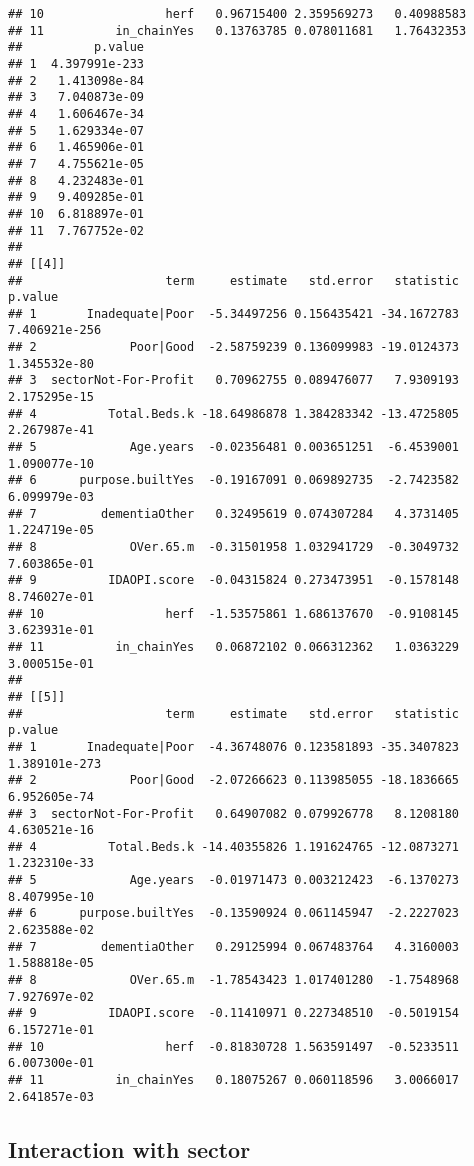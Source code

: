 \documentclass[]{article}
\begin{document}
\begin{verbatim}
## 10                 herf   0.96715400 2.359569273   0.40988583
## 11          in_chainYes   0.13763785 0.078011681   1.76432353
##          p.value
## 1  4.397991e-233
## 2   1.413098e-84
## 3   7.040873e-09
## 4   1.606467e-34
## 5   1.629334e-07
## 6   1.465906e-01
## 7   4.755621e-05
## 8   4.232483e-01
## 9   9.409285e-01
## 10  6.818897e-01
## 11  7.767752e-02
## 
## [[4]]
##                    term     estimate   std.error   statistic       p.value
## 1       Inadequate|Poor  -5.34497256 0.156435421 -34.1672783 7.406921e-256
## 2             Poor|Good  -2.58759239 0.136099983 -19.0124373  1.345532e-80
## 3  sectorNot-For-Profit   0.70962755 0.089476077   7.9309193  2.175295e-15
## 4          Total.Beds.k -18.64986878 1.384283342 -13.4725805  2.267987e-41
## 5             Age.years  -0.02356481 0.003651251  -6.4539001  1.090077e-10
## 6      purpose.builtYes  -0.19167091 0.069892735  -2.7423582  6.099979e-03
## 7         dementiaOther   0.32495619 0.074307284   4.3731405  1.224719e-05
## 8             OVer.65.m  -0.31501958 1.032941729  -0.3049732  7.603865e-01
## 9          IDAOPI.score  -0.04315824 0.273473951  -0.1578148  8.746027e-01
## 10                 herf  -1.53575861 1.686137670  -0.9108145  3.623931e-01
## 11          in_chainYes   0.06872102 0.066312362   1.0363229  3.000515e-01
## 
## [[5]]
##                    term     estimate   std.error   statistic       p.value
## 1       Inadequate|Poor  -4.36748076 0.123581893 -35.3407823 1.389101e-273
## 2             Poor|Good  -2.07266623 0.113985055 -18.1836665  6.952605e-74
## 3  sectorNot-For-Profit   0.64907082 0.079926778   8.1208180  4.630521e-16
## 4          Total.Beds.k -14.40355826 1.191624765 -12.0873271  1.232310e-33
## 5             Age.years  -0.01971473 0.003212423  -6.1370273  8.407995e-10
## 6      purpose.builtYes  -0.13590924 0.061145947  -2.2227023  2.623588e-02
## 7         dementiaOther   0.29125994 0.067483764   4.3160003  1.588818e-05
## 8             OVer.65.m  -1.78543423 1.017401280  -1.7548968  7.927697e-02
## 9          IDAOPI.score  -0.11410971 0.227348510  -0.5019154  6.157271e-01
## 10                 herf  -0.81830728 1.563591497  -0.5233511  6.007300e-01
## 11          in_chainYes   0.18075267 0.060118596   3.0066017  2.641857e-03
\end{verbatim}

\subsection{Interaction with sector}\label{interaction-with-sector}
\end{document}
